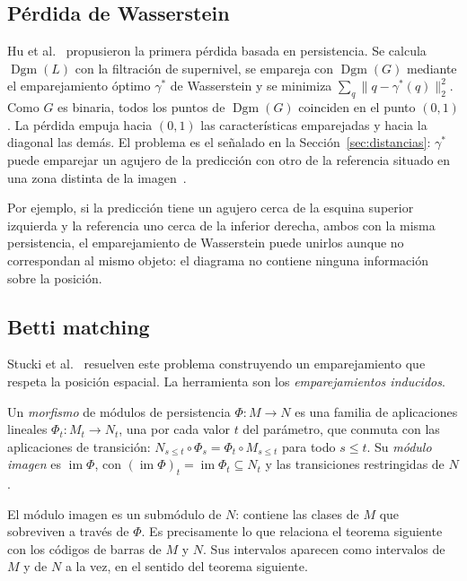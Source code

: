 \subsection{Pérdida de Wasserstein}

Hu et al.~\cite{hu2019} propusieron la primera pérdida basada en
persistencia. Se calcula $\operatorname{Dgm}(L)$ con la filtración de
supernivel, se empareja con $\operatorname{Dgm}(G)$ mediante el
emparejamiento óptimo $\gamma^*$ de Wasserstein y se minimiza
$\sum_{q}\|q-\gamma^*(q)\|_2^2$. Como $G$ es binaria, todos los puntos de
$\operatorname{Dgm}(G)$ coinciden en el punto $(0,1)$. La
pérdida empuja hacia $(0,1)$ las características emparejadas y hacia la
diagonal las demás. El problema es el señalado en la
Sección~\ref{sec:distancias}: $\gamma^*$ puede emparejar un agujero de la
predicción con otro de la referencia situado en una zona distinta de la
imagen~\cite{stucki2023}.

Por ejemplo, si la predicción tiene un agujero cerca de la esquina superior
izquierda y la referencia uno cerca de la inferior derecha, ambos con la misma
persistencia, el emparejamiento de Wasserstein puede unirlos aunque no
correspondan al mismo objeto: el diagrama no contiene ninguna información
sobre la posición.

\subsection{Betti matching}
\label{sec:betti-matching}

Stucki et al.~\cite{stucki2023} resuelven este problema construyendo un
emparejamiento que respeta la posición espacial. La herramienta son los
\emph{emparejamientos inducidos}.

\begin{definicion}
Un \emph{morfismo} de módulos de persistencia $\Phi:M\to N$ es una familia de
aplicaciones lineales $\Phi_t:M_t\to N_t$, una por cada valor $t$ del
parámetro, que conmuta con las aplicaciones de transición:
$N_{s\le t}\circ\Phi_s=\Phi_t\circ M_{s\le t}$ para todo $s\le t$. Su
\emph{módulo imagen} es $\operatorname{im}\Phi$, con
$(\operatorname{im}\Phi)_t=\operatorname{im}\Phi_t\subseteq N_t$ y las
transiciones restringidas de $N$.
\end{definicion}

El módulo imagen es un submódulo de $N$: contiene las clases de $M$ que
sobreviven a través de $\Phi$. Es precisamente lo que relaciona el teorema
siguiente con los códigos de barras de $M$ y $N$. Sus intervalos aparecen como
intervalos de $M$ y de $N$ a la vez, en el sentido del teorema siguiente.

